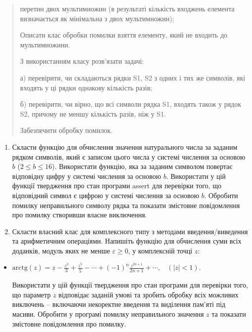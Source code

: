 \documentclass[]{article}
\begin{document}
\begin{quote}
перетин двох мультимножин (в результаті кількість входжень елемента
визначається як мінімальна з двох мультимножин);

Описати клас обробки помилки взяття елементу, який не входить до
мультимножини.

З використанням класу розв'язати задачі:

а) перевірити, чи складаються рядки S1, S2 з одних і тих же символів,
які входять у ці рядки однакову кількість разів;

б) перевірити, чи вірно, що всі символи рядка S1, входять також у рядок
S2, причому не меншу кількість разів, ніж у S1.

Забезпечити обробку помилок.
\end{quote}

\begin{enumerate}
\def\labelenumi{\arabic{enumi}.}
\item
  Скласти функцію для обчислення значення натурального числа за заданим
  рядком символів, який є записом цього числа у системі числення за
  основою \(b\) (\(2 \leq b \leq 16\)). Використати функцію, яка за
  заданим символом повертає відповідну цифру у системі числення за
  основою \(b\). Використати у цій функції твердження про стан програми
  assert для перевірки того, що відповідний символ є цифрою у системі
  числення за основою \(b\). Обробити помилку неправильного символу
  рядка та показати змістовне повідомлення про помилку створивши власне
  виключення.
\item
  Скласти власний клас для комплексного типу з методами
  введення/виведення та арифметичним операціями. Напишіть функцію для
  обчислення суми всіх доданків, модуль яких не менше
  \(\varepsilon \geq 0\), у комплексній точці \(z\):
\end{enumerate}

\begin{itemize}
\item
  \(\text{arctg}\left( z \right) = z - \frac{z^{3}}{3} + \frac{z^{5}}{5} - \cdots + {( - 1)}^{n}\frac{z^{2n + 1}}{2n + 1} + \cdots,\ \ \ \ (\left| z \right| < 1)\).

  Використати у цій функції твердження про стан програми для перевірки
  того, що параметр \(z\) відповідає заданій умові та зробить обробку
  всіх можливих виключень -- включаючи некоректне введення та виділення
  пам'яті під масиви. Обробити у програмі помилку неправильного значення
  \(z\) та показати змістовне повідомлення про помилку.
\end{itemize}
\end{document}
